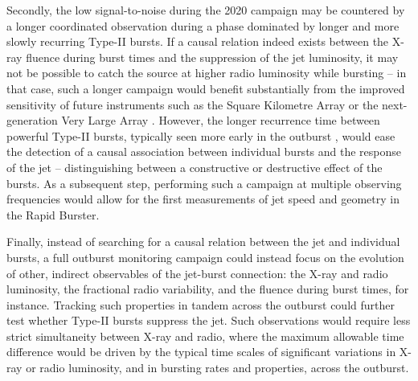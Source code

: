 \documentclass[fleqn,usenatbib]{mnras}
\begin{document}
Secondly, the low signal-to-noise during the 2020 campaign may be countered by a longer coordinated observation during a phase dominated by longer and more slowly recurring Type-II bursts. If a causal relation indeed exists between the X-ray fluence during burst times and the suppression of the jet luminosity, it may not be possible to catch the source at higher radio luminosity while bursting -- in that case, such a longer campaign would benefit substantially from the improved sensitivity of future instruments such as the Square Kilometre Array or the next-generation Very Large Array \citep{selina18}. However, the longer recurrence time between powerful Type-II bursts, typically seen more early in the outburst \citep{bagnoli2015}, would ease the detection of a causal association between individual bursts and the response of the jet -- distinguishing between a constructive or destructive effect of the bursts. As a subsequent step, performing such a campaign at multiple observing frequencies would allow for the first measurements of jet speed and geometry in the Rapid Burster. 

Finally, instead of searching for a causal relation between the jet and individual bursts, a full outburst monitoring campaign could instead focus on the evolution of other, indirect observables of the jet-burst connection: the X-ray and radio luminosity, the fractional radio variability, and the fluence during burst times, for instance. Tracking such properties in tandem across the outburst could further test whether Type-II bursts suppress the jet. Such observations would require less strict simultaneity between X-ray and radio, where the maximum allowable time difference would be driven by the typical time scales of significant variations in X-ray or radio luminosity, and in bursting rates and properties, across the outburst.
\end{document}
